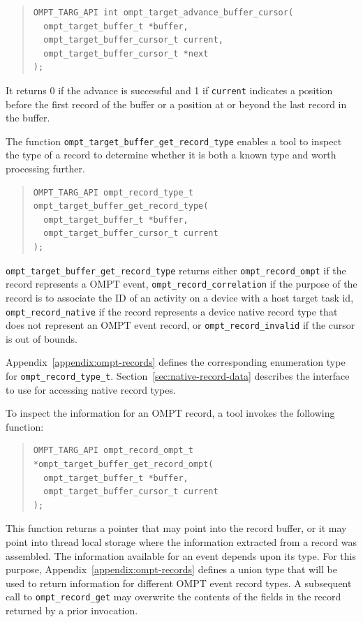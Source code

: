 \documentclass{article}
\begin{document}
\begin{quote}
\begin{verbatim}
OMPT_TARG_API int ompt_target_advance_buffer_cursor(
  ompt_target_buffer_t *buffer, 
  ompt_target_buffer_cursor_t current, 
  ompt_target_buffer_cursor_t *next
); 
\end{verbatim}
\end{quote}
It returns 0 if the advance is successful and 1 if \verb|current| indicates a position before the first record of the buffer or a position at or beyond the last record in the buffer.

The function \verb|ompt_target_buffer_get_record_type| enables a tool to inspect the type of a record to determine whether it is both a known type and worth processing further. 
\begin{quote}
\begin{verbatim}
OMPT_TARG_API ompt_record_type_t ompt_target_buffer_get_record_type(
  ompt_target_buffer_t *buffer, 
  ompt_target_buffer_cursor_t current
);
\end{verbatim}
\end{quote}
\sloppy
\verb|ompt_target_buffer_get_record_type| returns either \verb|ompt_record_ompt| if the record represents a OMPT event,  \verb|ompt_record_correlation| if the purpose of the record is to associate the ID of an activity on a device with a host target task id, \verb|ompt_record_native| if the record represents a device native record type that does not represent an OMPT event record, or \verb|ompt_record_invalid| if the cursor is out of bounds. 

Appendix~\ref{appendix:ompt-records} defines the corresponding enumeration type for \verb|ompt_record_type_t|. 
Section~\ref{sec:native-record-data} describes the interface to use for accessing native record types.
 

To inspect the information for an OMPT record, a tool invokes the following function:
\begin{quote}
\begin{verbatim}
OMPT_TARG_API ompt_record_ompt_t *ompt_target_buffer_get_record_ompt(
  ompt_target_buffer_t *buffer, 
  ompt_target_buffer_cursor_t current
);
\end{verbatim}
\end{quote}
This function returns a pointer that may point into the record buffer, or it may point into thread local storage where the information extracted from a record was assembled. The information available for an event depends upon its type. For this purpose, Appendix~\ref{appendix:ompt-records} defines a union type that will be used to return information for different OMPT event record types. A subsequent call to \verb|ompt_record_get| may overwrite the contents of the fields in the record returned by a prior invocation.
\end{document}
